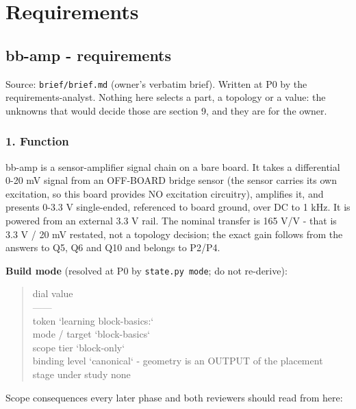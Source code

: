 \documentclass[11pt,a4paper]{article}
\begin{document}
\section{Requirements}
\subsection*{bb-amp - requirements}
Source: \texttt{brief/brief.md} (owner's verbatim brief). Written at P0 by the requirements-analyst. Nothing here selects a part, a topology or a value: the unknowns that would decide those are section 9, and they are for the owner.

\subsubsection*{1. Function}
bb-amp is a sensor-amplifier signal chain on a bare board. It takes a differential 0-20 mV signal from an OFF-BOARD bridge sensor (the sensor carries its own excitation, so this board provides NO excitation circuitry), amplifies it, and presents 0-3.3 V single-ended, referenced to board ground, over DC to 1 kHz. It is powered from an external 3.3 V rail. The nominal transfer is 165 V/V - that is 3.3 V / 20 mV restated, not a topology decision; the exact gain follows from the answers to Q5, Q6 and Q10 and belongs to P2/P4.

\textbf{Build mode} (resolved at P0 by \texttt{state.py mode}; do not re-derive):

\begin{quote}\small\ttfamily\raggedright
\textbar{} dial \textbar{} value \textbar{}\\
\textbar{}---\textbar{}---\textbar{}\\
\textbar{} token \textbar{} `learning block-basics:` \textbar{}\\
\textbar{} mode / target \textbar{} `block-basics` \textbar{}\\
\textbar{} scope tier \textbar{} `block-only` \textbar{}\\
\textbar{} binding level \textbar{} `canonical` - geometry is an OUTPUT of the placement \textbar{}\\
\textbar{} stage under study \textbar{} none \textbar{}
\end{quote}
Scope consequences every later phase and both reviewers should read from here:
\end{document}
